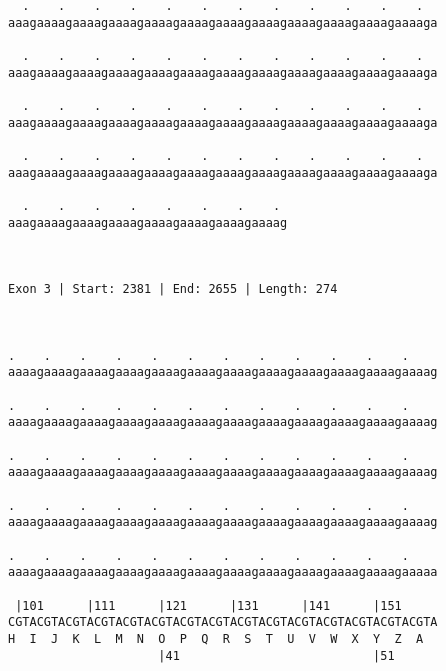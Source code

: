 \documentclass{article}
\begin{document}
\begin{Verbatim}
  .    .    .    .    .    .    .    .    .    .    .    .  
aaagaaaagaaaagaaaagaaaagaaaagaaaagaaaagaaaagaaaagaaaagaaaaga
                                                            
  .    .    .    .    .    .    .    .    .    .    .    .  
aaagaaaagaaaagaaaagaaaagaaaagaaaagaaaagaaaagaaaagaaaagaaaaga
                                                            
  .    .    .    .    .    .    .    .    .    .    .    .  
aaagaaaagaaaagaaaagaaaagaaaagaaaagaaaagaaaagaaaagaaaagaaaaga
                                                            
  .    .    .    .    .    .    .    .    .    .    .    .  
aaagaaaagaaaagaaaagaaaagaaaagaaaagaaaagaaaagaaaagaaaagaaaaga
                                                            
  .    .    .    .    .    .    .    . 
aaagaaaagaaaagaaaagaaaagaaaagaaaagaaaag
                                       
                                       
 
Exon 3 | Start: 2381 | End: 2655 | Length: 274



.    .    .    .    .    .    .    .    .    .    .    .    
aaaagaaaagaaaagaaaagaaaagaaaagaaaagaaaagaaaagaaaagaaaagaaaag
                                                            
.    .    .    .    .    .    .    .    .    .    .    .    
aaaagaaaagaaaagaaaagaaaagaaaagaaaagaaaagaaaagaaaagaaaagaaaag
                                                            
.    .    .    .    .    .    .    .    .    .    .    .    
aaaagaaaagaaaagaaaagaaaagaaaagaaaagaaaagaaaagaaaagaaaagaaaag
                                                            
.    .    .    .    .    .    .    .    .    .    .    .    
aaaagaaaagaaaagaaaagaaaagaaaagaaaagaaaagaaaagaaaagaaaagaaaag
                                                            
.    .    .    .    .    .    .    .    .    .    .    .    
aaaagaaaagaaaagaaaagaaaagaaaagaaaagaaaagaaaagaaaagaaaagaaaaa
                                                            
 |101      |111      |121      |131      |141      |151     
CGTACGTACGTACGTACGTACGTACGTACGTACGTACGTACGTACGTACGTACGTACGTA
H  I  J  K  L  M  N  O  P  Q  R  S  T  U  V  W  X  Y  Z  A  
                     |41                           |51      
  

\end{Verbatim}
\end{document}
